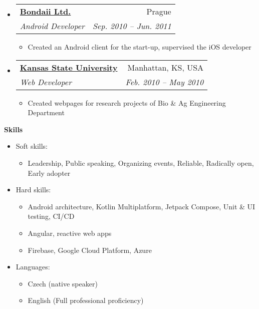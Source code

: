 \documentclass[letterpaper,11pt]{article}
\makeatletter
\newcommand{\resitem}[1]{\item #1 \vspace{-2pt}}
\newcommand{\resheading}[1]{{\large \colorbox{mygrey}{\begin{minipage}{\textwidth}{\textbf{#1 \vphantom{p\^{E}}}}\end{minipage}}}}
\newcommand{\ressubheading}[4]{
\begin{tabular*}{6.5in}{l@{\extracolsep{\fill}}r}
		\textbf{#1} & #2 \\
		\textit{#3} & \textit{#4} \\
\end{tabular*}\vspace{-6pt}}
\makeatother
\begin{document}
\begin{itemize}
{\begin{itemize}
				\end{itemize}
				}
	    \item 
			\ressubheading{\href{http://www.bondaii.com}{Bondaii Ltd.}}{Prague}{Android Developer}{Sep. 2010 -- Jun. 2011}
				{ \footnotesize
				\begin{itemize}
					\resitem{Created an Android client for the start-up, supervised the iOS developer}
				\end{itemize}
				}
	    \item 
			\ressubheading{\href{http://www.k-state.edu}{Kansas State University}}{Manhattan, KS, USA}{Web Developer}{Feb. 2010 -- May 2010}
				{ \footnotesize
				\begin{itemize}
					\resitem{Created webpages for research projects of Bio \& Ag Engineering Department}
				\end{itemize}
				}

	\end{itemize}  %
	
	\newpage

\resheading{Skills}

\begin{itemize}

	\item Soft skills:
		\begin{itemize}
			\footnotesize
			\resitem{Leadership, Public speaking, Organizing events, Reliable, Radically open, Early adopter}
		\end{itemize}	 
     \item Hard skills:
		 \begin{itemize}
	 		\footnotesize
			\resitem{Android architecture, Kotlin Multiplatform, Jetpack Compose, Unit \& UI testing, CI/CD}
                \resitem{Angular, reactive web apps}
			\resitem{Firebase, Google Cloud Platform, Azure}
		 \end{itemize} 	
	\item Languages:
		\begin{itemize}
			\footnotesize
			\resitem{Czech (native speaker)}
			\resitem{English (Full professional proficiency)}
		\end{itemize}			
\end{itemize}
\end{document}
